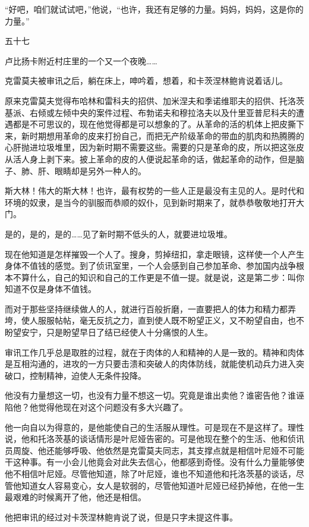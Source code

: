 “好吧，咱们就试试吧，”他说，“也许，我还有足够的力量。妈妈，妈妈，这是你的力量。”

五十七

卢比扬卡附近村庄里的一个又一个夜晚……

克雷莫夫被审讯之后，躺在床上，呻吟着，想着，和卡茨涅林鲍肯说着话儿。

原来克雷莫夫觉得布哈林和雷科夫的招供、加米涅夫和季诺维耶夫的招供、托洛茨基派、右倾或左倾中央的案件过程、布勃诺夫和穆拉洛夫以及什里亚普尼科夫的遭遇都是不可思议的，现在他觉得都是可以想象的了。从革命的活的机体上把皮撕下来，新时期想用革命的皮来打扮自己，而把无产阶级革命的带血的肌肉和热腾腾的心肝抛进垃圾堆里，因为新时期不需要这些。需要的只是革命的皮，所以把这张皮从活人身上剥下来。披上革命的皮的人便说起革命的话，做起革命的动作，但是脑子、肺、肝、眼睛却是另外一种人的。

斯大林！伟大的斯大林！也许，最有权势的一些人正是最没有主见的人。是时代和环境的奴隶，是当今的驯服而恭顺的奴仆，见到新时期来了，就恭恭敬敬地打开大门。

是的，是的，是的……见了新时期不低头的人，就要进垃圾堆。

现在他知道是怎样摧毁一个人了。搜身，剪掉纽扣，拿走眼镜，这样使一个人产生身体不值钱的感觉。到了侦讯室里，一个人会感到自己参加革命、参加国内战争根本不算什么，自己的知识和自己的工作更是不值一提。就是说，这是第二步：叫你知道不仅是身体不值钱。

而对于那些坚持继续做人的人，就进行百般折磨，一直要把人的体力和精力都弄垮，使人服服帖帖，毫无反抗之力，直到使人既不盼望正义，又不盼望自由，也不盼望安宁，只是盼望早日了结已经使人十分痛恨的人生。

审讯工作几乎总是取胜的过程，就在于肉体的人和精神的人是一致的。精神和肉体是互相沟通的，进攻的一方只要击溃和突破人的肉体防线，就能使机动兵力进入突破口，控制精神，迫使人无条件投降。

他没有力量想这一切，也没有力量不想这一切。究竟是谁出卖他？谁密告他？谁诬陷他？他觉得他现在对这个问题没有多大兴趣了。

他一向自以为得意的，是他能使自己的生活服从理性。可是现在不是这样了。理性说，他和托洛茨基的谈话情形是叶尼娅告密的。可是他现在整个的生活、他和侦讯员周旋、他还能够呼吸、他依然是克雷莫夫同志，其支撑点就是相信叶尼娅不可能干这种事。有一小会儿他竟会对此失去信心，他都感到奇怪。没有什么力量能够使他不相信叶尼娅。尽管他知道，除了叶尼娅，谁也不知道他和托洛茨基的谈话，尽管他知道女人容易变心，女人是软弱的，尽管他知道叶尼娅已经扔掉他，在他一生最艰难的时候离开了他，他还是相信。

他把审讯的经过对卡茨涅林鲍肯说了说，但是只字未提这件事。

